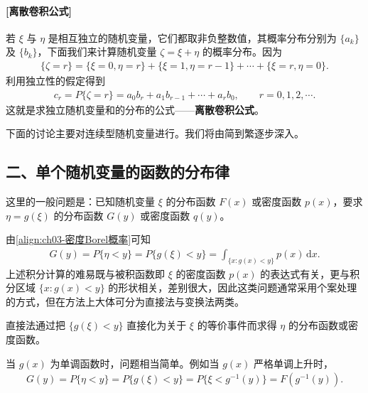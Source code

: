 \documentclass[../../main.tex]{subfiles}
\begin{document}
\paragraph{[离散卷积公式]}若 $\xi$ 与 $\eta$ 是相互独立的随机变量，它们都取非负整数值，其概率分布分别为 $\{a_k\}$ 及 $\{b_k\}$，下面我们来计算随机变量 $\zeta=\xi+\eta$ 的概率分布。因为
\begin{align*}
\{\zeta=r\}=\{\xi=0,\eta=r\}+\{\xi=1,\eta=r-1\}+\cdots+\{\xi=r,\eta=0\}.
\end{align*}
利用独立性的假定得到
\begin{align}
c_r=P\{\zeta=r\}=a_0b_r+a_1b_{r-1}+\cdots+a_rb_0,\qquad r=0,1,2,\cdots.\label{align:ch03-离散卷积}
\end{align}
这就是求独立随机变量和的分布的公式——\textbf{离散卷积公式}。

下面的讨论主要对连续型随机变量进行。我们将由简到繁逐步深入。

\subsection*{二、单个随机变量的函数的分布律}

这里的一般问题是：已知随机变量 $\xi$ 的分布函数 $F(x)$ 或密度函数 $p(x)$，要求 $\eta=g(\xi)$ 的分布函数 $G(y)$ 或密度函数 $q(y)$。

由\eqref{align:ch03-密度Borel概率}可知
\begin{align}
G(y)=P\{\eta<y\}=P\{g(\xi)<y\}=\int_{\{x:g(x)<y\}}p(x)\,\mathrm{d}x.\label{align:ch03-函数分布积分}
\end{align}
上述积分计算的难易既与被积函数即 $\xi$ 的密度函数 $p(x)$ 的表达式有关，更与积分区域 $\{x:g(x)<y\}$ 的形状相关，差别很大，因此这类问题通常采用个案处理的方式，但在方法上大体可分为直接法与变换法两类。

直接法通过把 $\{g(\xi)<y\}$ 直接化为关于 $\xi$ 的等价事件而求得 $\eta$ 的分布函数或密度函数。

当 $g(x)$ 为单调函数时，问题相当简单。例如当 $g(x)$ 严格单调上升时，
\begin{align*}G(y)=P\{\eta<y\}=P\{g(\xi)<y\}=P\{\xi<g^{-1}(y)\}=F(g^{-1}(y)).\end{align*}
\end{document}
